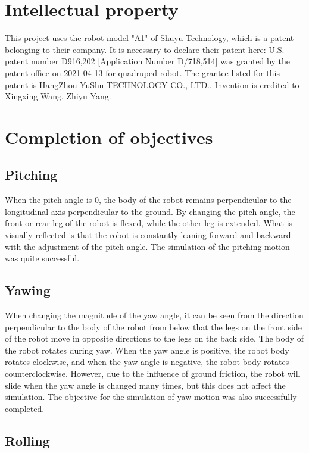 \section{Intellectual property}

This project uses the robot model "A1" of Shuyu Technology, which is a patent belonging to their company. It is necessary to declare their patent here: U.S. patent number D916,202 [Application Number D/718,514] was granted by the patent office on 2021-04-13 for quadruped robot. The grantee listed for this patent is HangZhou YuShu TECHNOLOGY CO., LTD.. Invention is credited to Xingxing Wang, Zhiyu Yang.

\section{Completion of objectives}

\subsection{Pitching}

When the pitch angle is 0, the body of the robot remains perpendicular to the longitudinal axis perpendicular to the ground. By changing the pitch angle, the front or rear leg of the robot is flexed, while the other leg is extended. What is visually reflected is that the robot is constantly leaning forward and backward with the adjustment of the pitch angle. The simulation of the pitching motion was quite successful.

\subsection{Yawing}

When changing the magnitude of the yaw angle, it can be seen from the direction perpendicular to the body of the robot from below that the legs on the front side of the robot move in opposite directions to the legs on the back side. The body of the robot rotates during yaw. When the yaw angle is positive, the robot body rotates clockwise, and when the yaw angle is negative, the robot body rotates counterclockwise. However, due to the influence of ground friction, the robot will slide when the yaw angle is changed many times, but this does not affect the simulation. The objective for the simulation of yaw motion was also successfully completed.

\subsection{Rolling}

